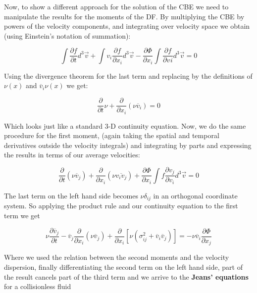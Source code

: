 Now, to show a different approach for the solution of the CBE we need to manipulate the results for the moments of the DF. By multiplying the CBE by powers of the velocity components, and integrating over velocity space we obtain (using Einstein's notation of summation):

\begin{equation}
\int \frac{\partial f}{\partial t}d^{3}\vec{v}+ \int v_{i}\frac{\partial f}{\partial x_{i}} d^{3}\vec{v}- \frac{\partial\Phi}{\partial x_{i}}\int \frac{\partial f}{\partial v_{}i} d^{3}\vec{v}= 0
\end{equation}

Using the divergence theorem for the last term and replacing by the definitions of $\nu(x)$ and $\overline{v}_{i}\nu(x)$ we get:

\begin{equation}
\frac{\partial}{\partial t}\nu+\frac{\partial}{\partial x_{i}}(\nu \overline{v}_{i})=0
\end{equation}

Which looks just like a standard 3-D continuity equation. Now, we do the same procedure for the first moment, (again taking the spatial and temporal derivatives outside the velocity integrals) and integrating by parts and expressing the results in terms of our average velocities:

\begin{equation}
\frac{\partial}{\partial t}(\nu \overline{v}_{j})+\frac{\partial}{\partial x_{i}}(\nu \overline{v_{i}v_{j}})+\frac{\partial \Phi}{\partial x_{i}}\int f\frac{\partial v_{j}}{\partial v_{i}}d^{3}\vec{v}=0
\end{equation} 

The last term on the left hand side becomes $\nu \delta_{ij}$ in an orthogonal coordinate system. So applying the product rule and our continuity equation to the first term we get

\begin{equation}
\nu \frac{\partial \overline{v}_{j}}{\partial t}-\overline{v}_{j}\frac{\partial}{\partial x_{i}}(\nu \overline{v}_{j})+\frac{\partial}{\partial x_{i}}[\nu(\sigma_{ij}^{2}+\overline{v}_{i}\overline{v}_{j})]=-\nu \overline{v}_{i}\frac{\partial \Phi}{\partial x_{j}}
\end{equation}

Where we used the relation between the second moments and the velocity dispersion, finally differentiating the second term on the left hand side, part of the result cancels part of the third term and we arrive to the \textbf{Jeans' equations} for a collisionless fluid

